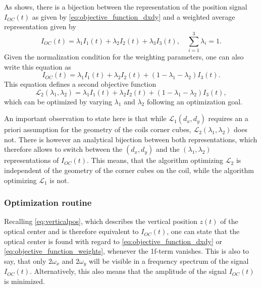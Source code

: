 \documentclass{report}
\numberwithin{tm}{section}
\begin{document}
As \cite[p.21-23]{Glardon.2024} shows, there is a bijection between the representation of the position signal $I_{OC}(t)$ as given by \cref{eq:objective_function_dxdy} and a weighted average representation given by \begin{equation}
	I_{OC}(t) = \lambda_1I_1(t) + \lambda_2 I_2(t) + \lambda_3 I_3(t), \quad \sum_{i=1}^{3}\lambda_i = 1.
\end{equation} Given the normalization condition for the weighting parameters, one can also write this equation as \begin{equation}\label{eq:objective_function_weights}
	I_{OC}(t) = \lambda_1 I_1(t) + \lambda_2I_2(t) + (1-\lambda_1-\lambda_2)I_3(t).
\end{equation} This equation defines a second objective function \begin{equation}\label{eq:to_optimize_weights}
	\mathcal{L}_2(\lambda_1,\lambda_2) = \lambda_1 I_1(t) + \lambda_2I_2(t) + (1-\lambda_1-\lambda_2)I_3(t),
\end{equation} which can be optimized by varying $\lambda_1$ and $\lambda_2$ following an optimization goal.

An important observation to state here is that while $\mathcal{L}_1(d_x, d_y)$ requires an a priori assumption for the geometry of the coils corner cubes, $\mathcal{L}_2(\lambda_1,\lambda_2)$ does not. There is however an analytical bijection between both representations, which therefore allows to switch between the $(d_x,d_y)$ and the $(\lambda_1,\lambda_2)$ representations of $I_{OC}(t)$. This means, that the algorithm optimizing $\mathcal{L}_2$ is independent of the geometry of the corner cubes on the coil, while the algorithm optimizing $\mathcal{L}_1$ is not.

\subsubsection{Optimization routine}
Recalling \cref{eq:verticalpos}, which describes the vertical position $z(t)$ of the optical center and is therefore equivalent to $I_{OC}(t)$, one can state that the optical center is found with regard to \cref{eq:objective_function_dxdy} or \cref{eq:objective_function_weights}, whenever the 1f-term vanishes. This is also to say, that only $2\omega_x$ and $2\omega_y$ will be visible in a frequency spectrum of the signal $I_{OC}(t)$. Alternatively, this also means that the amplitude of the signal $I_{OC}(t)$ is minimized. 
\end{document}
